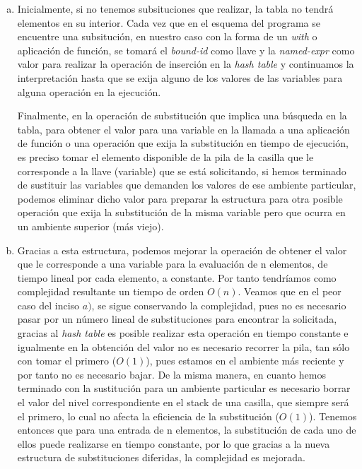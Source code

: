 \documentclass[12pt]{article}
\begin{document}
\begin{enumerate}[a)]
\item Inicialmente, si no tenemos subsituciones que realizar, la tabla no tendrá elementos en su interior. Cada vez que en el esquema del programa se encuentre una subsitución, en nuestro caso con la forma de un \textit{with} o aplicación de función, se tomará el \textit{bound-id} como llave y la \textit{named-expr} como valor para realizar la operación de inserción en la \textit{hash table} y continuamos la interpretación hasta que se exija alguno de los valores de las variables para alguna operación en la ejecución. \par
  Finalmente, en la operación de substitución que implica una búsqueda en la tabla, para obtener el valor para una variable en la llamada a una aplicación de función o una operación que exija la substitución en tiempo de ejecución, es preciso tomar el elemento disponible  de la pila de la casilla que le corresponde a la llave (variable) que se está solicitando, si hemos terminado de sustituir las variables que demanden los valores de ese ambiente particular, podemos eliminar dicho valor para preparar la estructura para otra posible operación que exija la substitución de la misma variable pero que ocurra en un ambiente superior (más viejo).
\item  Gracias a esta estructura, podemos mejorar la operación de obtener el valor que le corresponde a una variable para la evaluación de n
  elementos, de tiempo lineal por cada elemento, a constante. Por tanto tendríamos como complejidad resultante un tiempo de orden $O(n)$.
  Veamos que en el peor caso del inciso $a)$, se sigue conservando la complejidad, pues no es necesario pasar por un número lineal de substituciones para encontrar la solicitada, gracias al \textit{hash table} es posible realizar esta operación en tiempo constante e igualmente en la obtención del valor no es necesario recorrer la pila, tan sólo con tomar el primero ($O(1)$), pues estamos en el ambiente más reciente y por tanto no es necesario bajar. De la misma manera, en cuanto hemos terminado con la sustitución para un ambiente particular es necesario borrar el valor del nivel correspondiente en el stack de una casilla, que siempre será el primero, lo cual no afecta la eficiencia de la substitución ($O(1)$). Tenemos entonces que para una entrada de n elementos, la substitución de cada uno de ellos puede realizarse en tiempo constante, por lo que gracias a la nueva estructura de substituciones diferidas, la complejidad es mejorada. 
\end{enumerate}
\end{document}
